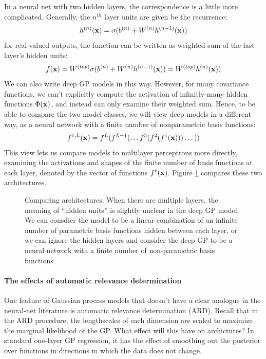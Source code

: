 \documentclass{article}
\begin{document}
In a neural net with two hidden layers, the correspondence is a little more complicated.  Generally, the $n^{th}$ layer units are given be the recurrence:
\begin{align}
h^{(n)}({\bf{x}}) = \sigma( b^{(n)} + W^{(n)} h^{(n-1)}({\bf{x}}) )
\end{align}
%
for real-valued outputs, the function can be written as weighted sum of the last layer's hidden units:
%
\begin{align}
f({\bf{x}}) = W^{(top)} \sigma( b^{(n)} + W^{(n)} h^{(n-1)}({\bf{x}}) ) = W^{(top)} h^{(n)}({\bf{x}}) )
\end{align}
%
We can also write deep GP models in this way.  However, for many covariance functions, we can't explicitly compute the activation of infinitly-many hidden functions $\Phi({\bf{x}})$, and instead can only examine their weighted sum.  Hence, to be able to compare the two model classes, we will view deep \gp{} models in a different way, as a neural network with a finite number of nonparametric basis functions:
%
\begin{align}
f^{1:L}({\bf{x}}) = f^L(f^{L-1}(\dots f^3(f^2(f^1({\bf{x}})))\dots))
\end{align}
%
This view lets us compare \gp{} models to multilayer perceptrons more directly, examining the activations and shapes of the finite number of basis functions at each layer, denoted by the vector of functions $f^\ell({\bf{x}})$.
Figure \ref{fig:architectures} compares these two architectures.


\begin{figure}

\caption{Comparing architectures.  When there are multiple layers, the meaning of ``hidden units'' is slightly unclear in the deep GP model.  We can consdier the model to be a linear combination of an infinite number of parametric basis functions hidden between each layer, or we can ignore the hidden layers and consider the deep GP to be a neural network with a finite number of non-parametric basis functions.}
\label{fig:architectures}
\end{figure}


\paragraph{The effects of automatic relevance determination}  One feature of Gaussian process models that doesn't have a clear anologue in the neural-net literature is automatic relevance determination (ARD).  Recall that in the ARD procedure, the lengthscales of each dimension are scaled to maximize the marginal likelihood of the GP.  What effect will this have on archictures?  In standard one-layer GP regression, it has the effect of smoothing out the posterior over functions in directions in which the data does not change.
\end{document}
